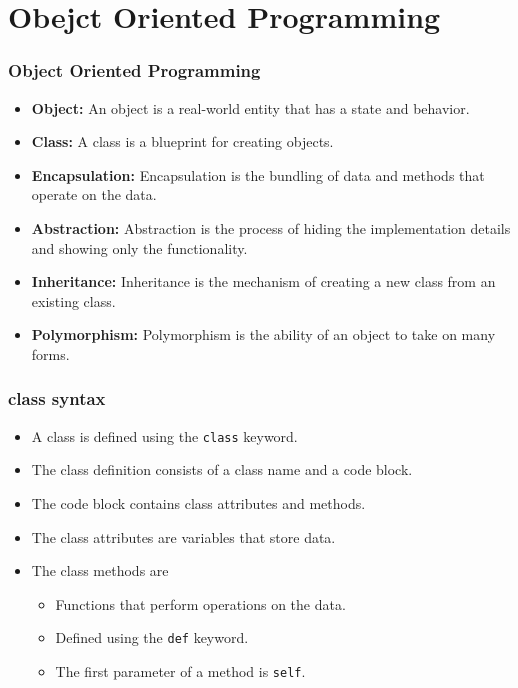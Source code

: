 \section{Obejct Oriented Programming}
\label{sec:OOPs}

\begin{frame}
    \frametitle{Object Oriented Programming}
    \begin{itemize}
        \item \textbf{Object:} An object is a real-world entity that has a state and behavior.
        \item \textbf{Class:} A class is a blueprint for creating objects.
        \item \textbf{Encapsulation:} Encapsulation is the bundling of data and methods that operate on the data.
        \item \textbf{Abstraction:} Abstraction is the process of hiding the implementation details and showing only the functionality.
        \item \textbf{Inheritance:} Inheritance is the mechanism of creating a new class from an existing class.
        \item \textbf{Polymorphism:} Polymorphism is the ability of an object to take on many forms.
    \end{itemize}
\end{frame}

\begin{frame}
    \frametitle{class syntax}
    \begin{itemize}
        \item A class is defined using the \texttt{class} keyword.
        \item The class definition consists of a class name and a code block.
        \item The code block contains class attributes and methods.
        \item The class attributes are variables that store data.
        \item The class methods are
            \begin{itemize}
                \item Functions that perform operations on the data.
                \item Defined using the \texttt{def} keyword.
                \item The first parameter of a method is \texttt{self}.
            \end{itemize}
    \end{itemize}       
\end{frame}

